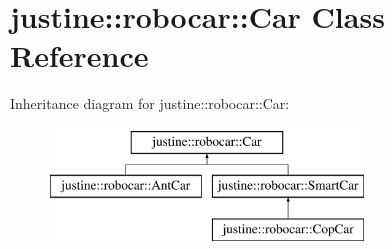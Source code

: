 \hypertarget{classjustine_1_1robocar_1_1Car}{\section{justine\-:\-:robocar\-:\-:Car Class Reference}
\label{classjustine_1_1robocar_1_1Car}
}
Inheritance diagram for justine\-:\-:robocar\-:\-:Car\-:\begin{figure}[H]
\begin{center}
\leavevmode
\includegraphics[height=3.000000cm]{classjustine_1_1robocar_1_1Car}
\end{center}
\end{figure}
